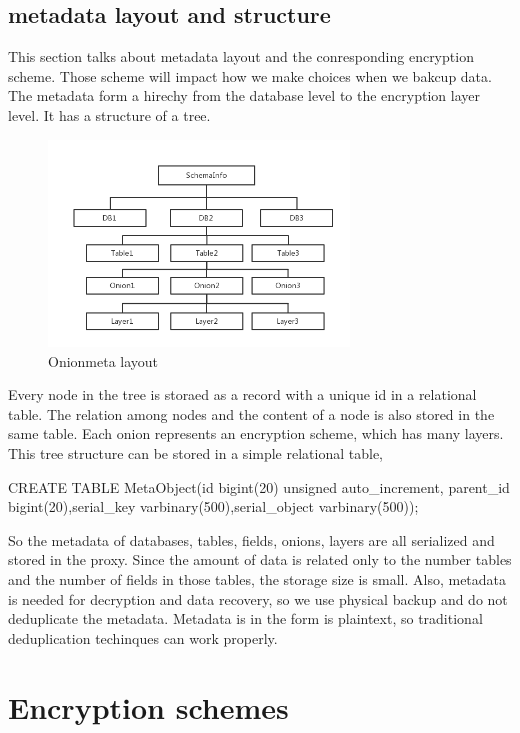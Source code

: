 \subsection{metadata layout and structure}

This section talks about metadata layout and the conresponding encryption scheme. Those scheme will impact how we make choices when we bakcup data. The metadata form a hirechy from the database level to the encryption layer level. It has a structure of a tree.


\begin{figure}[tb]
\centering
\includegraphics[width=8cm]{onionmeta.png}
\caption{Onionmeta layout}
\label{fig:stack}
\end{figure}

Every node in the tree is storaed as a record with a unique id in a relational table. The relation among nodes and the content of a node is also stored in the same table. Each onion represents an encryption scheme, which has many layers. This tree structure can be stored in a simple relational table, 

CREATE TABLE MetaObject(id bigint(20) unsigned auto\_increment, parent\_id bigint(20),serial\_key varbinary(500),serial\_object varbinary(500));  


So the metadata of databases, tables, fields, onions, layers are all serialized and stored in the proxy. Since the amount of data is related only to the number tables and the number of fields in those tables, the storage size is small. Also, metadata is needed for decryption and data recovery, so we use physical backup and do not deduplicate the metadata. Metadata is in the form is plaintext, so traditional deduplication techinques can work properly.



\section{Encryption schemes}


